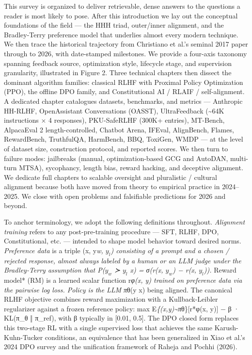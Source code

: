 \documentclass{article}
\begin{document}
This survey is organized to deliver retrievable, dense answers to the questions a reader is most likely to pose. After this introduction we lay out the conceptual foundations of the field --- the HHH triad, outer/inner alignment, and the Bradley-Terry preference model that underlies almost every modern technique. We then trace the historical trajectory from Christiano et al.'s seminal 2017 paper through to 2026, with date-stamped milestones. We provide a four-axis taxonomy spanning feedback source, optimization style, lifecycle stage, and supervision granularity, illustrated in Figure 2. Three technical chapters then dissect the dominant algorithm families: classical RLHF with Proximal Policy Optimization (PPO), the offline DPO family, and Constitutional AI / RLAIF / self-alignment. A dedicated chapter catalogues datasets, benchmarks, and metrics --- Anthropic HH-RLHF, OpenAssistant Conversations (OASST), UltraFeedback (\textasciitilde64K instructions × 4 responses), PKU-SafeRLHF (300K+ entries), MT-Bench, AlpacaEval 2 length-controlled, Chatbot Arena, IFEval, AlignBench, Flames, RewardBench, TruthfulQA, HarmBench, BBQ, ToxiGen, WMDP --- at the level of dataset size, construction protocol, and reported scores. We then turn to failure modes: jailbreaks (manual, optimization-based GCG and AutoDAN, multi-turn MTSA), sycophancy, length bias, reward hacking, and deceptive alignment. We dedicate full chapters to scalable oversight and pluralistic / cultural alignment because both have moved from theory to empirical practice in 2024--2025. We close with open problems and falsifiable predictions for 2026 and beyond.

To anchor terminology, we adopt the following definitions throughout. \emph{Alignment training} refers to any post-pre-training procedure --- SFT, RLHF, DPO, Constitutional, etc. --- intended to shape model behavior toward desired norms. \emph{Preference data} is a triple (x, y\emph{w, \(y_l\)) consisting of a prompt and a chosen / rejected response, almost always labeled by a human or an LLM judge under the Bradley-Terry assumption that P(\(y_w\) ≻ \(y_l\) \textbar{} x) = σ(r(x, \(y_w\)) − r(x, \(y_l\))). }Reward model* (RM) is a learned scalar function r\emph{φ(x, y) trained on preference data via the pairwise log loss. \emph{Policy} is the LLM π}θ(y \textbar{} x) being aligned. The canonical RLHF objective combines reward maximization with a Kullback-Leibler regularizer against a frozen reference policy: max E\emph{\{(x,y)\textasciitilde π}θ\}{[}r*φ(x, y){]} − β · KL(π\_θ ‖ π\_ref), with β typically in {[}0.01, 0.5{]}. The DPO closed form replaces this two-stage RL with a single supervised loss that achieves the same Karush-Kuhn-Tucker conditions, an equivalence that has been generalized in Xiao et al.'s 2024 DPO survey and the unification framework of Raheja and Pochhi (2026).
\end{document}
